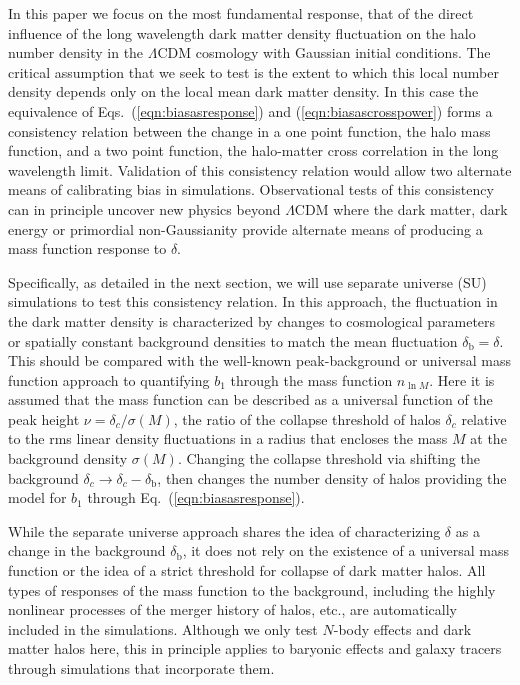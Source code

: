 \documentclass[prd,twocolumn,amsmath,amssymb,floatfix,superscriptaddress]{revtex4-1}
\newcommand{\br}{\textrm{b}}
\newcommand{\lnM}{{\ln\!M}}
\begin{document}
In this paper we focus on the most fundamental response, that of the direct influence of the long wavelength
dark matter density fluctuation on the halo number density in the $\Lambda$CDM cosmology with Gaussian
initial conditions.    The critical assumption that we seek to test
is the extent to which  this local number density depends only on the
local mean dark matter density.
In this case the equivalence of   Eqs.~(\ref{eqn:biasasresponse})
and (\ref{eqn:biasascrosspower}) forms a consistency relation between the change in a one point
function, the halo mass function, and a two point function, the halo-matter cross correlation in
the long wavelength limit. 
Validation of this consistency relation would allow two alternate means of calibrating bias in simulations.
Observational tests of this consistency can in principle uncover new physics beyond $\Lambda$CDM
where the dark matter, dark energy or primordial non-Gaussianity provide alternate means of producing
a mass function
response to $\delta$.

Specifically, as detailed in the next section, we will use separate universe (SU)
simulations to test this consistency relation. In this approach,
the fluctuation in the  dark matter density is characterized by changes to cosmological parameters
or spatially constant background densities to match the mean fluctuation
$\delta_\br=\delta$.  This should be compared with the well-known peak-background or universal mass function approach to
quantifying $b_1$ through the mass function $n_\lnM$.   Here it is assumed that the mass function can be
described as a universal function of the peak height $\nu = \delta_c/\sigma(M)$,
the ratio of the collapse threshold of
halos $\delta_c$ relative to the rms linear density fluctuations in a radius that encloses the mass $M$ at the background density $\sigma(M)$.   Changing the collapse threshold via shifting the background
$\delta_c \rightarrow \delta_c-\delta_\br$, then changes the number density of halos providing the model for
$b_1$ through Eq.~(\ref{eqn:biasasresponse}).   

While the separate universe approach shares the idea of
characterizing $\delta$ as a change in the background $\delta_\br$, it does not rely on the existence of a universal mass function
or the idea of a strict threshold for collapse of dark matter halos.   All types of responses of the mass function to the
background, including the highly nonlinear processes of the merger history of halos, etc.,
are automatically included in the simulations.   Although we
only test $N$-body effects and dark matter halos here, this in principle applies to baryonic effects  and galaxy tracers
through simulations that incorporate them.
 
\end{document}
